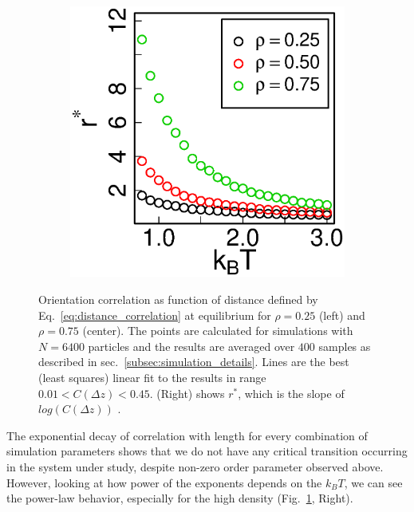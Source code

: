 \begin{figure}[t]
\begin{subfigure}[t]{0.32\textwidth}
\end{subfigure}
\begin{subfigure}[t]{0.32\textwidth}
	\centering
	\includegraphics[width=\textwidth]{Images/correlation_length_eq}
\end{subfigure}
	\captionsetup{justification=centering, width=0.9\textwidth}
	\caption{Orientation correlation as function of distance defined by Eq.~\eqref{eq:distance_correlation} at equilibrium for $\rho = 0.25$ (left) and $\rho = 0.75$ (center). The points are calculated for simulations with $N = 6400$ particles and the results are averaged over $400$ samples as described in sec.~\ref{subsec:simulation_details}. Lines are the best (least squares) linear fit to the results in range $0.01 < C(\Delta z) < 0.45$. (Right) shows $r^*$, which is the slope of $log(C(\Delta z))$ .}
	\label{fig:dist_corr_eq}
\end{figure}

The exponential decay of correlation with length for every combination of simulation parameters shows that we do not have any critical transition occurring in the system under study, despite non-zero order parameter observed above. However, looking at how power of the exponents depends on the $k_BT$, we can see the power-law behavior, especially for the high density (Fig.~\ref{fig:dist_corr_eq}, Right).

